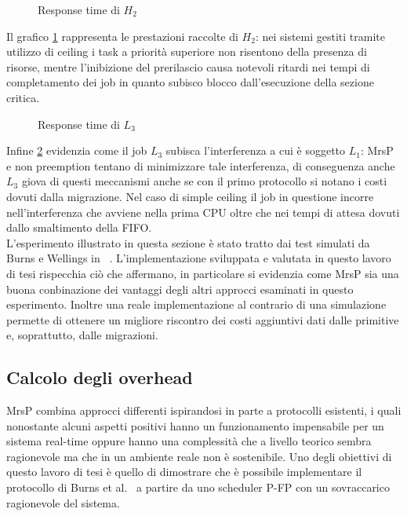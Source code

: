 \begin{figure}
  \centering
  \confrontoProtocolliHDue
  \caption{Response time di $H_2$}
  \label{fig:test_protocols_H2}
\end{figure}

\noindent Il grafico \ref{fig:test_protocols_H2} rappresenta le prestazioni raccolte di $H_2$: nei sistemi gestiti tramite utilizzo di ceiling i task a priorità superiore non risentono della presenza di risorse, mentre l'inibizione del prerilascio causa notevoli ritardi nei tempi di completamento dei job in quanto subisco blocco dall'esecuzione della sezione critica.\\

\begin{figure}
  \centering
  \confrontoProtocolliLTre
  \caption{Response time di $L_3$}
  \label{fig:test_protocols_L3}
\end{figure}

\noindent Infine \ref{fig:test_protocols_L3} evidenzia come il job $L_3$ subisca l'interferenza a cui è soggetto $L_1$: MrsP e non preemption tentano di minimizzare tale interferenza, di conseguenza anche $L_3$ giova di questi meccanismi anche se con il primo protocollo si notano i costi dovuti dalla migrazione. Nel caso di simple ceiling il job in questione incorre nell'interferenza che avviene nella prima CPU oltre che nei tempi di attesa dovuti dallo smaltimento della FIFO.\\

\noindent L'esperimento illustrato in questa sezione è stato tratto dai test simulati da Burns e Wellings in ~\cite{Burns:2013:SCM:2547348.2547350}. L'implementazione sviluppata e valutata in questo lavoro di tesi rispecchia ciò che affermano, in particolare si evidenzia come MrsP sia una buona conbinazione dei vantaggi degli altri approcci esaminati in questo esperimento. Inoltre una reale implementazione al contrario di una simulazione permette di ottenere un migliore riscontro dei costi aggiuntivi dati dalle primitive e, soprattutto, dalle migrazioni.\\

\newpage

\subsection{Calcolo degli overhead}
\label{sec:overhead}

\noindent MrsP combina approcci differenti ispirandosi in parte a protocolli esistenti, i quali nonostante alcuni aspetti positivi hanno un funzionamento impensabile per un sistema real-time oppure hanno una complessità che a livello teorico sembra ragionevole ma che in un ambiente reale non è sostenibile. Uno degli obiettivi di questo lavoro di tesi è quello di dimostrare che è possibile implementare il protocollo di Burns et al.~\cite{Burns:2013:SCM:2547348.2547350} a partire da uno scheduler P-FP con un sovraccarico ragionevole del sistema.

